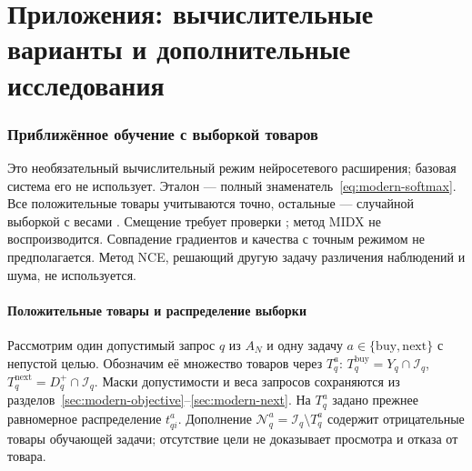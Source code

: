 \documentclass[12pt,a4paper]{article}
\theoremstyle{plainru}
\begin{document}
\clearpage\part{Приложения: вычислительные варианты и дополнительные исследования}\label{part:appendices}
\appendix
\section{Приближённое обучение с выборкой товаров}
\label{sec:sampled-training}
\label{sec:sampled-overview}

Это необязательный вычислительный режим нейросетевого расширения;
базовая система его не использует. Эталон --- полный
знаменатель~\eqref{eq:modern-softmax}. Все положительные товары
учитываются точно, остальные --- случайной выборкой с весами
\cite{candidatesampling}. Смещение требует проверки
\cite{sampledsoftmax2025}; метод MIDX не воспроизводится.
Совпадение градиентов и качества с точным режимом не предполагается.
Метод NCE, решающий другую задачу различения наблюдений и шума, не используется.

\subsection{Положительные товары и распределение выборки}
\label{sec:sampled-proposal}

Рассмотрим один допустимый запрос $q$ из $A_N$ и одну задачу
$a\in\{\mathrm{buy},\mathrm{next}\}$ с непустой целью.
Обозначим её множество товаров через $T_q^a$:
$T_q^{\mathrm{buy}}=Y_q\cap\mathcal I_q$,
$T_q^{\mathrm{next}}=D_q^+\cap\mathcal I_q$.
Маски допустимости и веса запросов сохраняются
из разделов~\ref{sec:modern-objective}--\ref{sec:modern-next}.
На $T_q^a$ задано прежнее равномерное распределение $t_{qi}^a$.
Дополнение $\mathcal N_q^a=\mathcal I_q\setminus T_q^a$ содержит
отрицательные товары обучающей задачи; отсутствие цели не доказывает
просмотра и отказа от товара.
\end{document}
